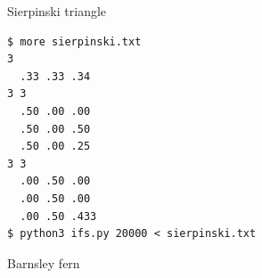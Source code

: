 \documentclass[8pt,a4paper,compress]{beamer}
\begin{document}
\begin{frame}[fragile]
\pause

Sierpinski triangle

\begin{minipage}{160pt}
\begin{lstlisting}[language={}]
$ more sierpinski.txt
3   
  .33 .33 .34 
3 3 
  .50 .00 .00 
  .50 .00 .50 
  .50 .00 .25 
3 3 
  .00 .50 .00 
  .00 .50 .00 
  .00 .50 .433 
$ python3 ifs.py 20000 < sierpinski.txt
\end{lstlisting}
\end{minipage}%
\begin{minipage}{140pt}
\begin{center}
\hfill {}
\end{center}
\end{minipage}

\pause
\bigskip

Barnsley fern


\end{frame}
\end{document}
